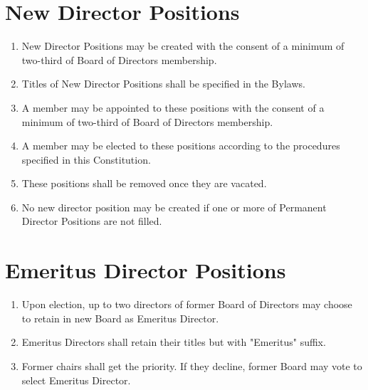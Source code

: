 \section{New Director Positions}
\begin{enumerate}
	\item New Director Positions may be created with the consent of a minimum of two-third of Board of Directors membership.
	\item Titles of New Director Positions shall be specified in the Bylaws.
	\item A member may be appointed to these positions with the consent of a minimum of two-third of Board of Directors membership.
	\item A member may be elected to these positions according to the procedures specified in this Constitution.
	\item These positions shall be removed once they are vacated.
	\item No new director position may be created if one or more of Permanent Director Positions are not filled.
\end{enumerate}

\section{Emeritus Director Positions}
\begin{enumerate}
	\item Upon election, up to two directors of former Board of Directors may choose to retain in new Board as Emeritus Director.
	\item Emeritus Directors shall retain their titles but with "Emeritus" suffix.
	\item Former chairs shall get the priority. If they decline, former Board may vote to select Emeritus Director.
\end{enumerate}

